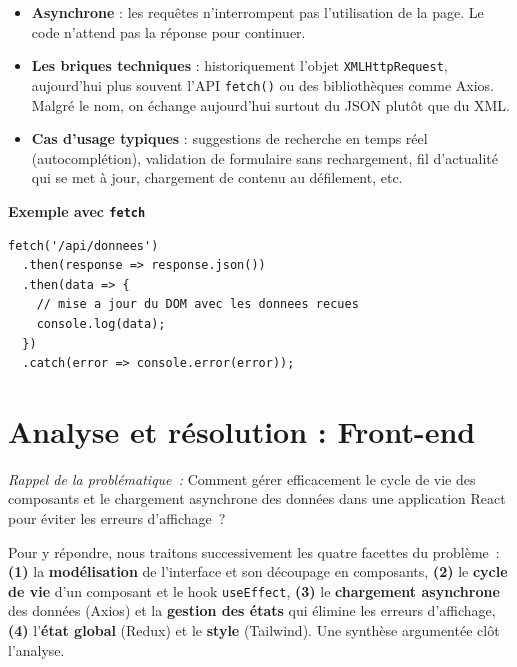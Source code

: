 \begin{itemize}
    \item \textbf{Asynchrone} : les requêtes n'interrompent pas l'utilisation
    de la page. Le code n'attend pas la réponse pour continuer.

    \item \textbf{Les briques techniques} : historiquement l'objet
    \texttt{XMLHttpRequest}, aujourd'hui plus souvent l'API \texttt{fetch()}
    ou des bibliothèques comme Axios. Malgré le nom, on échange aujourd'hui
    surtout du JSON plutôt que du XML.

    \item \textbf{Cas d'usage typiques} : suggestions de recherche en temps
    réel (autocomplétion), validation de formulaire sans rechargement, fil
    d'actualité qui se met à jour, chargement de contenu au défilement, etc.
\end{itemize}

\textbf{Exemple avec \texttt{fetch}}

\begin{verbatim}
fetch('/api/donnees')
  .then(response => response.json())
  .then(data => {
    // mise a jour du DOM avec les donnees recues
    console.log(data);
  })
  .catch(error => console.error(error));
\end{verbatim}

\newpage

\section*{Analyse et résolution : Front-end}

\noindent \textit{Rappel de la problématique~:} \og{}Comment gérer efficacement le cycle de vie des composants et le chargement asynchrone des données dans une application React pour éviter les erreurs d'affichage~?\fg{}

\vspace{0.3cm}

\noindent Pour y répondre, nous traitons successivement les quatre facettes du problème~: \textbf{(1)} la \textbf{modélisation} de l'interface et son découpage en composants, \textbf{(2)} le \textbf{cycle de vie} d'un composant et le hook \texttt{useEffect}, \textbf{(3)} le \textbf{chargement asynchrone} des données (Axios) et la \textbf{gestion des états} qui élimine les erreurs d'affichage, \textbf{(4)} l'\textbf{état global} (Redux) et le \textbf{style} (Tailwind). Une synthèse argumentée clôt l'analyse.

